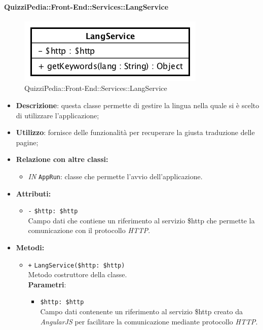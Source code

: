 \paragraph{QuizziPedia::Front-End::Services::LangService}
\begin{figure}[ht]
	\centering
	\includegraphics[scale=0.60]{UML/Classi/Front-End/QuizziPedia_Front-end_Services_LangService.png}
	\caption{QuizziPedia::Front-End::Services::LangService}
\end{figure}\FloatBarrier
\begin{itemize}
	\item \textbf{Descrizione}: questa classe permette di gestire la lingua nella quale si è scelto di utilizzare l'applicazione;
	\item \textbf{Utilizzo}: fornisce delle funzionalità per recuperare la giusta traduzione delle pagine;
	\item \textbf{Relazione con altre classi:}
	\begin{itemize}
		\item \textit{IN} \texttt{AppRun}: classe che permette l'avvio dell'applicazione.
	\end{itemize}
	\item \textbf{Attributi:}
	\begin{itemize}
		\item \texttt{-} \texttt{\$http: \$http} \\ Campo dati che contiene un riferimento al servizio \$http che permette la comunicazione con il protocollo \textit{HTTP}.
	\end{itemize}
	\item \textbf{Metodi:}
	\begin{itemize}
		\item \texttt{+} \texttt{LangService(\$http: \$http)} \\ Metodo costruttore della classe. \\
		\textbf{Parametri}:
		\begin{itemize}
			\item \texttt{\$http: \$http} \\ Campo dati contenente un riferimento al servizio \$http creato da \textit{AngularJS} per facilitare la comunicazione mediante protocollo \textit{HTTP}.

\end{itemize}
\end{itemize}
\end{itemize}
